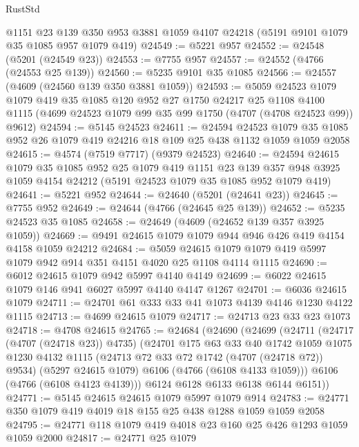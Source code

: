 \begin{lexlean}{RustStd}
\begin{coremodule}
{\begin{coremodule}
{{{{{{{{{{{{{{{{{{{{{{{{{{{{{{{{{{{    @1151
    @23
    @139
    @350
    @953
    @3881
    @1059
    @4107
    @24218
    (@5191 @9101 @1079 @35 @1085 @957 @1079 @419)
@24549 := @5221 @957
@24552 := @24548 (@5201 (@24549 @23))
@24553 := @7755 @957
@24557 := @24552 (@4766 (@24553 @25 @139))
@24560 := @5235 @9101 @35 @1085
@24566 := @24557 (@4609 (@24560 @139 @350 @3881 @1059))
@24593 := @5059
    @24523
    @1079
    @1079
    @419
    @35
    @1085
    @120
    @952
    @27
    @1750
    @24217
    @25
    @1108
    @4100
    @1115
    (@4699 @24523 @1079 @99 @35 @99 @1750 (@4707 (@4708 @24523 @99)) @9612)
@24594 := @5145 @24523
@24611 := @24594
    @24523
    @1079
    @35
    @1085
    @952
    @26
    @1079
    @419
    @24216
    @18
    @109
    @25
    @438
    @1132
    @1059
    @1059
    @2058
@24615 := @4574 (@7519 @7717) (@9379 @24523)
@24640 := @24594
    @24615
    @1079
    @35
    @1085
    @952
    @25
    @1079
    @419
    @1151
    @23
    @139
    @357
    @948
    @3925
    @1059
    @4154
    @24212
    (@5191 @24523 @1079 @35 @1085 @952 @1079 @419)
@24641 := @5221 @952
@24644 := @24640 (@5201 (@24641 @23))
@24645 := @7755 @952
@24649 := @24644 (@4766 (@24645 @25 @139))
@24652 := @5235 @24523 @35 @1085
@24658 := @24649 (@4609 (@24652 @139 @357 @3925 @1059))
@24669 := @9491 @24615 @1079 @1079 @944 @946 @426 @419 @4154 @4158 @1059 @24212
@24684 := @5059 @24615 @1079 @1079 @419 @5997 @1079 @942 @914 @351 @4151 @4020 @25 @1108 @4114 @1115
@24690 := @6012 @24615 @1079 @942 @5997 @4140 @4149
@24699 := @6022 @24615 @1079 @146 @941 @6027 @5997 @4140 @4147 @1267
@24701 := @6036 @24615 @1079
@24711 := @24701 @61 @333 @33 @41 @1073 @4139 @4146 @1230 @4122 @1115
@24713 := @4699 @24615 @1079
@24717 := @24713 @23 @33 @23 @1073
@24718 := @4708 @24615
@24765 := @24684
    (@24690
      (@24699
        (@24711
          (@24717 (@4707 (@24718 @23)) @4735)
          (@24701
            @175
            @63
            @33
            @40
            @1742
            @1059
            @1075
            @1230
            @4132
            @1115
            (@24713 @72 @33 @72 @1742 (@4707 (@24718 @72)) @9534)
            (@5297 @24615 @1079)
            @6106
            (@4766 (@6108 @4133 @1059)))
          @6106
          (@4766 (@6108 @4123 @4139)))
        @6124
        @6128
        @6133
        @6138
        @6144
        @6151))
@24771 := @5145 @24615 @24615 @1079 @5997 @1079 @914
@24783 := @24771 @350 @1079 @419 @4019 @18 @155 @25 @438 @1288 @1059 @1059 @2058
@24795 := @24771 @118 @1079 @419 @4018 @23 @160 @25 @426 @1293 @1059 @1059 @2000
@24817 := @24771
    @25
    @1079
}}}}}}}}}}}}}}}}}}}}}}}}}}}}}}}}}}}
\end{coremodule}}
\end{coremodule}
\end{lexlean}
